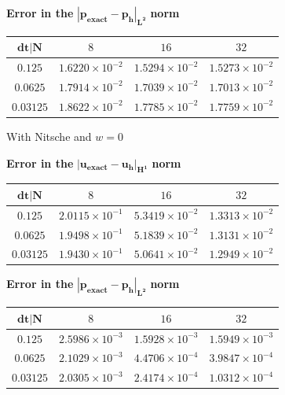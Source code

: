 \documentclass[11pt,a4paper,titlepage]{report}
\begin{document}
\begin{center}
\textbf{Error in the } $ \mathbf{ | p_{exact} - p_h |_{L^2}}$ \textbf{norm}
\begin{tabular}{| c | c | c | c |}
\hline
$\mathbf{dt | N}$ & $8$ & $16$ & $32$ \\
\hline
$ 0.125 $ & $1.6220 \times 10^{-2}$ & $1.5294 \times 10^{-2}$ &  $ 1.5273 \times 10^{-2}$ \\
\hline
$ 0.0625$ & $1.7914  \times 10^{-2}$ & $1.7039 \times 10^{-2}$ &  $ 1.7013  \times 10^{-2}$ \\
\hline
$ 0.03125 $ & $ 1.8622 \times 10^{-2}$ & $1.7785 \times 10^{-2}$ & $ 1.7759 \times 10^{-2}$ \\
\hline
\end{tabular}
\end{center}

With Nitsche and $w=0$
\begin{center}
\textbf{Error in the } $ \mathbf{ | u_{exact} - u_h |_{H^1}}$ \textbf{norm}
\begin{tabular}{| c | c | c | c |}
\hline
$\mathbf{dt | N}$ & $8$ & $16$ & $32$ \\
\hline
$ 0.125 $ & $2.0115 \times 10^{-1}$ & $5.3419 \times 10^{-2}$ &  $ 1.3313 \times 10^{-2}$ \\
\hline
$ 0.0625$ & $1.9498  \times 10^{-1}$ & $5.1839 \times 10^{-2}$ &  $ 1.3131  \times 10^{-2}$ \\
\hline
$ 0.03125 $ & $ 1.9430 \times 10^{-1}$ & $5.0641 \times 10^{-2}$ & $ 1.2949 \times 10^{-2}$ \\
\hline
\end{tabular}
\end{center}

\begin{center}
\textbf{Error in the } $ \mathbf{ | p_{exact} - p_h |_{L^2}}$ \textbf{norm}
\begin{tabular}{| c | c | c | c |}
\hline
$\mathbf{dt | N}$ & $8$ & $16$ & $32$ \\
\hline
$ 0.125 $ & $2.5986 \times 10^{-3}$ & $1.5928 \times 10^{-3}$ &  $ 1.5949 \times 10^{-3}$ \\
\hline
$ 0.0625$ & $2.1029  \times 10^{-3}$ & $4.4706 \times 10^{-4}$ &  $ 3.9847  \times 10^{-4}$ \\
\hline
$ 0.03125 $ & $ 2.0305 \times 10^{-3}$ & $2.4174 \times 10^{-4}$ & $ 1.0312 \times 10^{-4}$ \\
\hline
\end{tabular}
\end{center}
\end{document}
